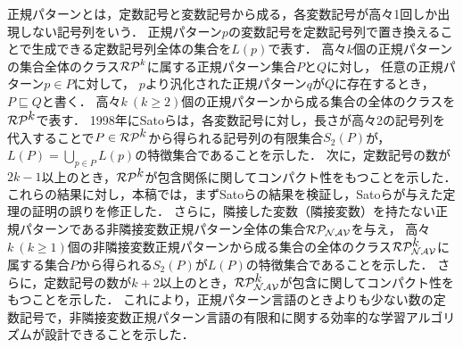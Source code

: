\begin{summary}
正規パターンとは，定数記号と変数記号から成る，各変数記号が高々1回しか出現しない記号列をいう．
正規パターン$p$の変数記号を定数記号列で置き換えることで生成できる定数記号列全体の集合を$L(p)$で表す．
高々$k$個の正規パターンの集合全体のクラス$\mathcal{RP}^{k}$に属する正規パターン集合$P$と$Q$に対し，
任意の正規パターン$p\in P$に対して，
$p$より汎化された正規パターン$q$が$Q$に存在するとき，$P\sqsubseteq Q$と書く．
高々$k~(k\geq 2)$個の正規パターンから成る集合の全体のクラスを$\mathcal{RP^{\mbox{$k$}}}$で表す．
1998年にSatoら\cite{Sato1}は，各変数記号に対し，長さが高々2の記号列を代入することで$P\in \mathcal{RP^{\mbox{$k$}}}$から得られる記号列の有限集合$S_2(P)$が，
$L(P)=\bigcup_{p\in P}L(p)$の特徴集合であることを示した．
次に，定数記号の数が$2k-1$以上のとき，$\mathcal{RP^{\mbox{$k$}}}$が包含関係に関してコンパクト性をもつことを示した．
これらの結果に対し，本稿では，まずSatoら\cite{Sato1}の結果を検証し，Satoらが与えた定理の証明の誤りを修正した．
さらに，隣接した変数（隣接変数）を持たない正規パターンである非隣接変数正規パターン全体の集合$\mathcal{RP_{NAV}}$を与え，
高々$k~(k\ge 1)$個の非隣接変数正規パターンから成る集合の全体のクラス$\mathcal{RP^{\mbox{$k$}}_{NAV}}$に属する集合$P$から得られる$S_2(P)$が$L(P)$の特徴集合であることを示した．
さらに，定数記号の数が$k+2$以上のとき，$\mathcal{RP^{\mbox{$k$}}_{NAV}}$が包含に関してコンパクト性をもつことを示した．
これにより，正規パターン言語のときよりも少ない数の定数記号で，非隣接変数正規パターン言語の有限和に関する効率的な学習アルゴリズムが設計できることを示した．
\end{summary}
